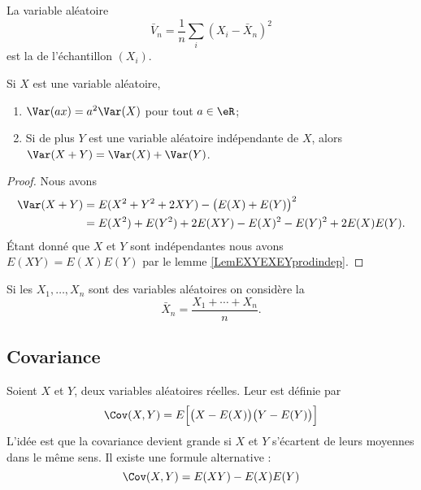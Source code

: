 La variable aléatoire 
\begin{equation}
    \bar V_n=\frac{1}{ n }\sum_i(X_i-\bar X_n)^2
\end{equation}
est la  de l'échantillon \( (X_i)\).

\begin{lemma}       \label{LemEXYEXEYindep}\label{PropVarPropnnlin}
    Si \( X\) est une variable aléatoire,
    \begin{enumerate}
        \item
            $\Var(ax)=a^2\Var(X)$ pour tout \( a\in\eR\);
        \item
            Si de plus \( Y\) est une variable aléatoire indépendante de \( X\), alors $\Var(X+Y)=\Var(X)+\Var(Y)$.
    \end{enumerate}
\end{lemma}

\begin{proof}
    Nous avons
    \begin{subequations}
        \begin{align}
            \Var(X+Y)&=E(X^2+Y^2+2XY)-\big( E(X)+E(Y) \big)^2\\
            &=E(X^2)+E(Y^2)+2E(XY)-E(X)^2-E(Y)^2+2E(X)E(Y).
        \end{align}
    \end{subequations}
    Étant donné que \( X\) et \( Y\) sont indépendantes nous avons \( E(XY)=E(X)E(Y)\) par le lemme \ref{LemEXYEXEYprodindep}.
\end{proof}

Si les \( X_1,\ldots,X_n\) sont des variables aléatoires on considère la 
\begin{equation}
    \bar X_n=\frac{ X_1+\cdots+X_n }{ n }.
\end{equation}

\subsection{Covariance}

Soient \( X\) et \( Y\), deux variables aléatoires réelles. Leur  est définie par
\begin{equation}    \label{EqHUWtttN}
    \Cov(X,Y)=E\Big[ \big( X-E(X) \big)\big( Y-E(Y) \big) \Big]
\end{equation}
L'idée est que la covariance devient grande si \( X\) et \( Y\) s'écartent de leurs moyennes dans le même sens. Il existe une formule alternative :
\begin{equation}
    \Cov(X,Y)=E(XY)-E(X)E(Y)
\end{equation}

